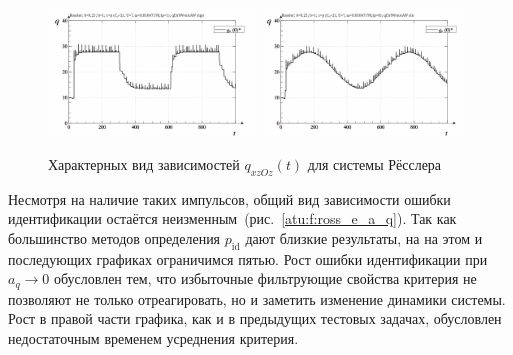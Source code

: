 \begin{figure}[ht!]
\begin{center}
  \includegraphics[width=0.49\textwidth]{p/cha/ross/ross_id-p_t_q_ql3rlWvnAAW_sign.png}
  \hfill
  \includegraphics[width=0.49\textwidth]{p/cha/ross/ross_id-p_t_q_ql3rlWvnAAW_sin.png}
\end{center}
  \caption{Характерных вид зависимостей $q_{xzOz}(t)$ для системы Рёсслера}
\label{atu:f:ross_q_t}
\end{figure}

Несмотря на наличие таких импульсов,
общий вид зависимости ошибки идентификации
остаётся неизменным~(рис.~\ref{atu:f:ross_e_a_q}).
Так как большинство методов определения $p_\mathrm{id}$
дают близкие результаты, на на этом и последующих графиках
ограничимся пятью. Рост ошибки идентификации при $a_q \to 0$
обусловлен тем, что избыточные фильтрующие свойства критерия
не позволяют не только отреагировать, но и заметить изменение динамики системы.
Рост в правой части графика, как и в предыдущих тестовых задачах,
обусловлен недостаточным временем усреднения критерия.

